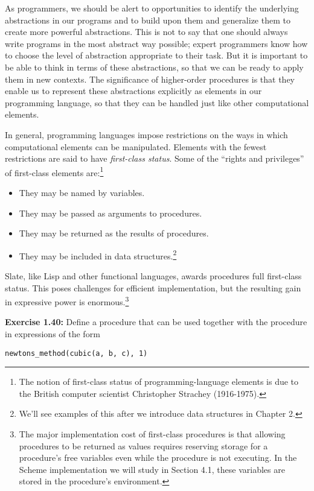 As programmers, we should be alert to opportunities to identify the underlying abstractions in our programs and to build upon them and generalize them to create more powerful abstractions. This is not to say that one should always write programs in the most abstract way possible; expert programmers know how to choose the level of abstraction appropriate to their task. But it is important to be able to think in terms of these abstractions, so that we can be ready to apply them in new contexts. The significance of higher-order procedures is that they enable us to represent these abstractions explicitly as elements in our programming language, so that they can be handled just like other computational elements.

In general, programming languages impose restrictions on the ways in which computational elements can be manipulated. Elements with the fewest restrictions are said to have \emph{first-class status}. Some of the ``rights and privileges'' of first-class elements are:\footnote{The notion of first-class status of programming-language elements is due to the British computer scientist Christopher Strachey (1916-1975).}

\begin{itemize}
\item They may be named by variables.
\item They may be passed as arguments to procedures.
\item They may be returned as the results of procedures.
\item They may be included in data structures.\footnote{We'll see examples of this after we introduce data structures in Chapter 2.}
\end{itemize}

Slate, like Lisp and other functional languages, awards procedures full first-class status. This poses challenges for efficient implementation, but the resulting gain in expressive power is enormous.\footnote{The major implementation cost of first-class procedures is that allowing procedures to be returned as values requires reserving storage for a procedure's free variables even while the procedure is not executing. In the Scheme implementation we will study in Section 4.1, these variables are stored in the procedure's environment.}

\textbf{Exercise 1.40:} Define a procedure  that can be used together with the  procedure in expressions of the form

\begin{lstlisting}[style=slate]
newtons_method(cubic(a, b, c), 1)
\end{lstlisting}

